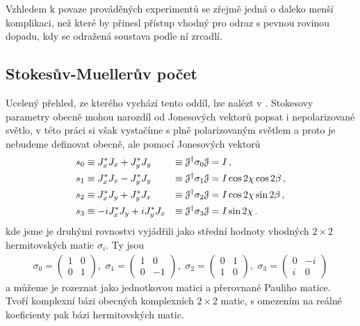 Vzhledem k povaze prováděných experimentů se zřejmě jedná o daleko menší komplikaci, než které by přinesl přístup vhodný pro odraz s pevnou rovinou dopadu, kdy se odražená soustava podle ní zrcadlí.


\subsection{Stokesův-Muellerův počet}
\label{chap:Stokes-Mueller}

Ucelený přehled, ze kterého vychází tento oddíl, lze nalézt v \cite{gilReviewMuellerMatrix2014,ossikovskiPoincareSphereMapping2013}.
Stokesovy parametry obecně mohou narozdíl od Jonesových vektorů popsat i nepolarizované světlo,
v této práci si však vystačíme s plně polarizovaným světlem a proto je nebudeme definovat obecně, ale pomocí Jonesových vektorů
\begin{alignat}{3}
    s_0 &\equiv J_x^* J_x+J_y^* J_y &\equiv \mathcal{J}^\dagger \sigma_0 \mathcal{J} &= I \,,\\
    s_1 &\equiv J_x^* J_x-J_y^* J_y &\equiv \mathcal{J}^\dagger \sigma_1 \mathcal{J} &= I \cos 2\chi \cos 2\beta \,,  \\
    s_2 &\equiv J_x^* J_y+J_y^* J_x &\equiv \mathcal{J}^\dagger \sigma_2 \mathcal{J} &= I \cos 2\chi \sin 2\beta \,, \\
    s_3 &\equiv -i J_x^* J_y+i J_y^* J_x  &\equiv \mathcal{J}^\dagger \sigma_3 \mathcal{J} &= I \sin 2\chi \,.
\end{alignat}
kde jsme je druhými rovnostvi vyjádřili jako střední hodnoty vhodných $2\times 2$ hermitovských matic $\sigma_{i}$. Ty jsou
\begin{align}
    \sigma_0=\begin{pmatrix} 1 & 0 \\ 0 & 1 \end{pmatrix} ,\,\,
    \sigma_1=\begin{pmatrix} 1 & 0 \\ 0 & -1 \end{pmatrix} ,\,\,
    \sigma_2=\begin{pmatrix} 0 & 1 \\ 1 & 0 \end{pmatrix} ,\,\,
    \sigma_3=\begin{pmatrix} 0 & -i \\ i & 0 \end{pmatrix}
\end{align}
a můžeme je rozeznat jako jednotkovou matici a přerovnané Pauliho matice.
Tvoří komplexní bázi obecných komplexních $2\times 2$ matic, s omezením na reálné koeficienty pak bázi hermitovských matic. 

